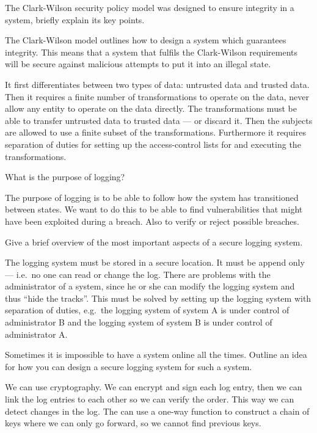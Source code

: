 \question[6]\label{q:accountability}
The Clark-Wilson security policy model was designed to ensure integrity in 
a system, briefly explain its key points.

\begin{solution}
  The Clark-Wilson model outlines how to design a system which guarantees 
  integrity.
  This means that a system that fulfils the Clark-Wilson requirements will be 
  secure against malicious attempts to put it into an illegal state.

  It first differentiates between two types of data: untrusted data and trusted 
  data.
  Then it requires a finite number of transformations to operate on the data, 
  never allow any entity to operate on the data directly.
  The transformations must be able to transfer untrusted data to trusted data 
  --- or discard it.
  Then the subjects are allowed to use a finite subset of the transformations.
  Furthermore it requires separation of duties for setting up the 
  access-control lists for and executing the transformations.
\end{solution}


\question\label{q:accountability}
What is the purpose of logging?

\begin{solution}
  The purpose of logging is to be able to follow how the system has 
  transitioned between states.
  We want to do this to be able to find vulnerabilities that might have been 
  exploited during a breach.
  Also to verify or reject possible breaches.
\end{solution}


\question\label{q:accountability}
Give a brief overview of the most important aspects of a secure logging system.

\begin{solution}
  The logging system must be stored in a secure location.
  It must be append only --- i.e.\ no one can read or change the log.
  There are problems with the administrator of a system, since he or she can 
  modify the logging system and thus \enquote{hide the tracks}.
  This must be solved by setting up the logging system with separation of 
  duties, e.g.\ the logging system of system A is under control of 
  administrator B and the logging system of system B is under control of 
  administrator A.
\end{solution}


\question[5]\label{q:accountability}
Sometimes it is impossible to have a system online all the times.
Outline an idea for how you can design a secure logging system for such 
a system.

\begin{solution}
  We can use cryptography.
  We can encrypt and sign each log entry, then we can link the log entries to 
  each other so we can verify the order.
  This way we can detect changes in the log.
  The can use a one-way function to construct a chain of keys where we can only 
  go forward, so we cannot find previous keys.
\end{solution}
